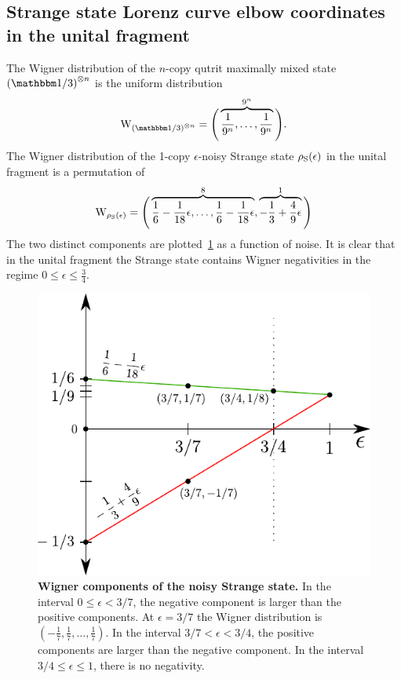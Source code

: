 \subsection{Strange state Lorenz curve elbow coordinates in the unital fragment}\label{app:lcsu_coord_elb}
The Wigner distribution of the $n$-copy qutrit maximally mixed state $\left(\id/3\right)^{\otimes n}$ is the uniform distribution 
\begin{equation}\label{eq:wu}
	\W{\left(\id/3\right)^{\otimes n}} = \Bigg( \overbrace{\frac{1}{9^n}, \dots, \frac{1}{9^n}}^{9^n} \Bigg).
\end{equation}
The Wigner distribution of the 1-copy $\epsilon$-noisy Strange state $\rho_{\rm{S}}(\epsilon)$ in the unital fragment is a permutation of 
\begin{equation}\label{eq:wsu}
	\W{\rho_{\rm{S}}(\epsilon)} = \Bigg( \overbrace{\frac{1}{6} - \frac{1}{18}\epsilon, \dots, \frac{1}{6} - \frac{1}{18}\epsilon}^8, \overbrace{-\frac{1}{3} + \frac{4}{9}\epsilon}^1 \Bigg)
\end{equation}
The two distinct components are plotted~\cref{fig:noisys} as a function of noise. 
It is clear that in the unital fragment the Strange state contains Wigner negativities in the regime $0 \leq \epsilon \leq \tfrac{3}{4}$.
\begin{figure}[h]
    \centering
    \includegraphics[scale=0.7]{figs/noisys.pdf}
    \caption{\textbf{Wigner components of the noisy Strange state.} 
    In the interval $0 \leq \epsilon < 3/7$, the negative component is larger than the positive components.
    At $\epsilon = 3/7$ the Wigner distribution is $(-\frac{1}{7},\frac{1}{7},\dots,\frac{1}{7})$.
    In the interval $3/7 < \epsilon < 3/4$, the positive components are larger than the negative component.
    In the interval $3/4 \leq \epsilon \leq 1$, there is no negativity.
    }
    \label{fig:noisys}
\end{figure}

